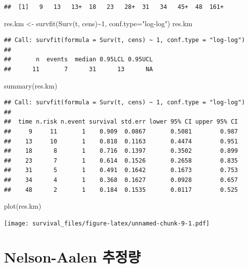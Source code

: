 \documentclass[
]{book}
\newenvironment{Shaded}{\begin{snugshade}}{\end{snugshade}}
\newcommand{\AttributeTok}[1]{\textcolor[rgb]{0.77,0.63,0.00}{#1}}
\newcommand{\DecValTok}[1]{\textcolor[rgb]{0.00,0.00,0.81}{#1}}
\newcommand{\FunctionTok}[1]{\textcolor[rgb]{0.00,0.00,0.00}{#1}}
\newcommand{\NormalTok}[1]{#1}
\newcommand{\OtherTok}[1]{\textcolor[rgb]{0.56,0.35,0.01}{#1}}
\newcommand{\SpecialCharTok}[1]{\textcolor[rgb]{0.00,0.00,0.00}{#1}}
\newcommand{\StringTok}[1]{\textcolor[rgb]{0.31,0.60,0.02}{#1}}
\theoremstyle{definition}
\theoremstyle{definition}
\theoremstyle{definition}
\theoremstyle{definition}
\theoremstyle{remark}
\begin{document}
\begin{verbatim}
##  [1]   9   13   13+  18   23   28+  31   34   45+  48  161+
\end{verbatim}

\begin{Shaded}
\begin{Highlighting}[]
\NormalTok{res.km }\OtherTok{\textless{}{-}} \FunctionTok{survfit}\NormalTok{(}\FunctionTok{Surv}\NormalTok{(t, cens)}\SpecialCharTok{\textasciitilde{}}\DecValTok{1}\NormalTok{,  }\AttributeTok{conf.type=}\StringTok{"log{-}log"}\NormalTok{)}
\NormalTok{res.km}
\end{Highlighting}
\end{Shaded}

\begin{verbatim}
## Call: survfit(formula = Surv(t, cens) ~ 1, conf.type = "log-log")
## 
##       n  events  median 0.95LCL 0.95UCL 
##      11       7      31      13      NA
\end{verbatim}

\begin{Shaded}
\begin{Highlighting}[]
\FunctionTok{summary}\NormalTok{(res.km)}
\end{Highlighting}
\end{Shaded}

\begin{verbatim}
## Call: survfit(formula = Surv(t, cens) ~ 1, conf.type = "log-log")
## 
##  time n.risk n.event survival std.err lower 95% CI upper 95% CI
##     9     11       1    0.909  0.0867       0.5081        0.987
##    13     10       1    0.818  0.1163       0.4474        0.951
##    18      8       1    0.716  0.1397       0.3502        0.899
##    23      7       1    0.614  0.1526       0.2658        0.835
##    31      5       1    0.491  0.1642       0.1673        0.753
##    34      4       1    0.368  0.1627       0.0928        0.657
##    48      2       1    0.184  0.1535       0.0117        0.525
\end{verbatim}

\begin{Shaded}
\begin{Highlighting}[]
\FunctionTok{plot}\NormalTok{(res.km)}
\end{Highlighting}
\end{Shaded}

\texttt{[image: survival\_files/figure-latex/unnamed-chunk-9-1.pdf]}

\hypertarget{nelson-aalen-uxcd94uxc815uxb7c9}{%
\section{Nelson-Aalen 추정량}\label{nelson-aalen-uxcd94uxc815uxb7c9}}
\end{document}
